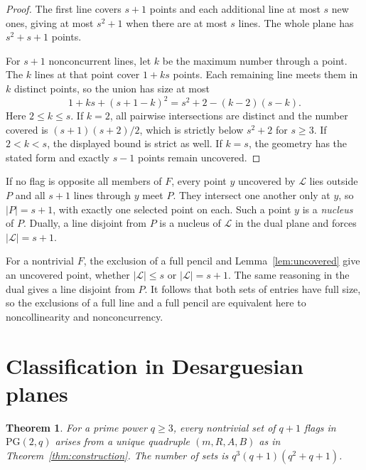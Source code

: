 \documentclass[11pt,a4paper]{amsart}
\newtheorem{theorem}{Theorem}
\newcommand{\PG}{\mathrm{PG}}
\begin{document}
\begin{proof}
The first line covers \(s+1\) points and each additional line at most \(s\) new ones, giving at most \(s^2+1\) when there are at most \(s\) lines. The whole plane has \(s^2+s+1\) points.

For \(s+1\) nonconcurrent lines, let \(k\) be the maximum number through a point. The \(k\) lines at that point cover \(1+ks\) points. Each remaining line meets them in \(k\) distinct points, so the union has size at most
\[
1+ks+(s+1-k)^2=s^2+2-(k-2)(s-k).
\]
Here \(2\leq k\leq s\). If \(k=2\), all pairwise intersections are distinct and the number covered is \((s+1)(s+2)/2\), which is strictly below \(s^2+2\) for \(s\geq3\). If \(2<k<s\), the displayed bound is strict as well. If \(k=s\), the geometry has the stated form and exactly \(s-1\) points remain uncovered.
\end{proof}

If no flag is opposite all members of \(F\), every point \(y\) uncovered by \(\mathcal L\) lies outside \(P\) and all \(s+1\) lines through \(y\) meet \(P\). They intersect one another only at \(y\), so \(|P|=s+1\), with exactly one selected point on each. Such a point \(y\) is a \emph{nucleus} of \(P\). Dually, a line disjoint from \(P\) is a nucleus of \(\mathcal L\) in the dual plane and forces \(|\mathcal L|=s+1\).

For a nontrivial \(F\), the exclusion of a full pencil and Lemma~\ref{lem:uncovered} give an uncovered point, whether \(|\mathcal L|\leq s\) or \(|\mathcal L|=s+1\). The same reasoning in the dual gives a line disjoint from \(P\). It follows that both sets of entries have full size, so the exclusions of a full line and a full pencil are equivalent here to noncollinearity and nonconcurrency.

\section{Classification in Desarguesian planes}

\begin{theorem}\label{thm:classification}
For a prime power \(q\geq3\), every nontrivial set of \(q+1\) flags in \(\PG(2,q)\) arises from a unique quadruple \((m,R,A,B)\) as in Theorem~\ref{thm:construction}. The number of sets is \(q^3(q+1)(q^2+q+1)\).
\end{theorem}
\end{document}
